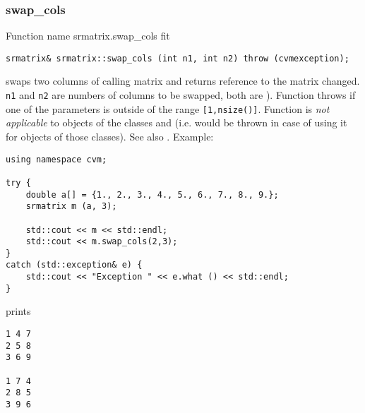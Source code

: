\subsubsection{swap\_cols}
Function%
\pdfdest name {srmatrix.swap_cols} fit
\begin{verbatim}
srmatrix& srmatrix::swap_cols (int n1, int n2) throw (cvmexception);
\end{verbatim}
swaps two columns of  calling matrix and returns  reference to
the matrix changed. \verb"n1" and \verb"n2" are
 numbers of columns to be swapped, 
both are \Based).
Function throws  
if one of the parameters is outside of the range
\verb"[1,nsize()]".
Function is 
\emph{not applicable} to objects of the classes
 and
 (i.e.  would be thrown
in case of using it for objects of those classes).
See also .
Example:
\begin{Verbatim}
using namespace cvm;

try {
    double a[] = {1., 2., 3., 4., 5., 6., 7., 8., 9.};
    srmatrix m (a, 3);

    std::cout << m << std::endl;
    std::cout << m.swap_cols(2,3);
}
catch (std::exception& e) {
    std::cout << "Exception " << e.what () << std::endl;
}
\end{Verbatim}
prints
\begin{Verbatim}
1 4 7
2 5 8
3 6 9

1 7 4
2 8 5
3 9 6
\end{Verbatim}
\newpage





